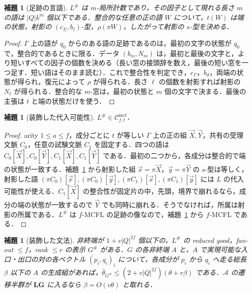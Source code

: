 \documentclass[11pt,a4paper]{ltjsarticle}
\numberwithin{equation}{section}
\theoremstyle{plain}
\newtheorem{lemma}[theorem]{補題}
\theoremstyle{definition}
\theoremstyle{remark}
\theoremstyle{plain}
\newcommand{\Cmcf}[2]{\mathcal{C}^{\mathrm{mcf}}_{#1,#2}}
\newcommand{\tuple}[1]{\vec{#1}}
\newcommand{\LG}{\mathbf{LG}}
\newcommand{\bth}{\bar\theta}
\begin{document}
\begin{lemma}[足跡の言語]
\label{lem:trace-local}
$L^\#$ は $m$-局所計数であり，その因子として現れる長さ $m$ の語は $|Q|k^m$ 個以下である．整合的な任意の正の語 $W$ について，$t(W)$ は端の状態，射影の $(c_\Sigma,b_\ell)$-型，$\rho(\pi W)$，したがって射影の $s$-型を決める．
\end{lemma}

\begin{proof}
$\Gamma$ 上の語が $q_0$ からのある語の足跡であるのは，最初の文字の状態が $q_0$ で，整合的であるときに限る．データ $(b_m,N_m)$ は，最初と最後の文字と，より短いすべての因子の個数を決める（長い窓の接頭辞を数え，最後の短い窓を一つ足す．短い語はそのまま読む）．これで整合性を判定でき，$c_\Gamma$，$b_d$，両端の状態が得られ，復元によって $\rho$ が得られる．長さ $\ell$ の個数を射影すれば射影の $N_\ell$ が得られる．整合的な $m$-窓は，最初の状態と $m$ 個の文字で決まる．最後の主張は $t$ と端の状態だけを使う．
\end{proof}

\begin{lemma}[装飾した代入可能性]
\label{lem:dec-subst}
$L^\#\in\Cmcf{f}{t}$．
\end{lemma}

\begin{proof}
arity $1\le a\le f$，成分ごとに $t$ が等しい $\Gamma$ 上の正の組 $\tuple X,\tuple Y$，共有の受理文脈 $C_0$，任意の試験文脈 $C_1$ を固定する．四つの語は $C_0[\tuple X],C_0[\tuple Y],C_1[\tuple X],C_1[\tuple Y]$ である．最初の二つから，各成分は整合的で端の状態が一致する．補題~\ref{lem:trace-local} から射影した組 $\tuple x=\pi\tuple X$，$\tuple y=\pi\tuple Y$ の $s$-型は等しく，射影した語 $(\pi C_0)[\tuple x],(\pi C_0)[\tuple y],(\pi C_1)[\tuple x],(\pi C_1)[\tuple y]$ には $L$ の代入可能性が使える．$C_1[\tuple X]$ の整合性が固定片の中，先頭，境界で崩れるなら，成分の端の状態が一致するので $\tuple Y$ でも同時に崩れる．そうでなければ，所属は射影の所属である．$L^\#$ は $f$-MCFL の足跡の像なので，補題~\ref{lem:dec-grammar} から $f$-MCFL である．
\end{proof}

\begin{lemma}[装飾した文法]
\label{lem:dec-grammar}
非終端が $1+v|Q|^{2f}$ 個以下の，$L^\#$ の reduced good，fan-out $\le f$，rank $\le r$ の表示 $G^\#$ がある．$G$ の各非終端 $A$ と，$A$ で実現可能な入口・出口の対の各ベクトル $(p_i,q_i)_i$ について，各成分が $p_i$ から $q_i$ へ走る総長 $\beta$ 以下の $A$ の生成組があれば，$\bth_{G^\#}\le(2+v|Q|^{2f})(\theta+r\beta)$ である．$\mathcal A$ の遷移半群が $\LG$ に入るなら $\beta=O(v\theta)$ と取れる．
\end{lemma}
\end{document}
